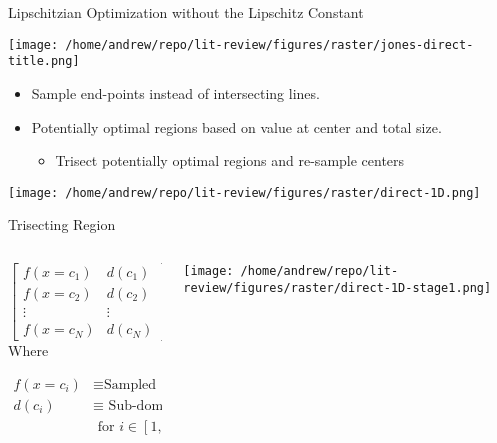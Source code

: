 \documentclass[presentation, aspectratio=1610]{beamer}
\begin{document}
\begin{frame}[label={sec:orgaa12c6b}]{Lipschitzian Optimization without the Lipschitz Constant}
\begin{center}
\texttt{[image: /home/andrew/repo/lit-review/figures/raster/jones-direct-title.png]}
\end{center}
\begin{itemize}
\item Sample end-points instead of intersecting lines.
\item Potentially optimal regions based on value at center and total size.
\begin{itemize}
\item Trisect potentially optimal regions and re-sample centers
\end{itemize}
\end{itemize}
\begin{center}
\texttt{[image: /home/andrew/repo/lit-review/figures/raster/direct-1D.png]}
\end{center}
\end{frame}
\begin{frame}[label={sec:org2f0a68a}]{Trisecting Region}
\begin{columns}
\begin{column}{0.4\columnwidth}
\begin{equation*}
  \begin{bmatrix}
    f(x=c_{1}) & d(c_{1})\\
    f(x=c_{2}) & d(c_{2})\\
    \vdots & \vdots \\
    f(x=c_{N}) & d(c_{N})
  \end{bmatrix}
\end{equation*}
Where

\begin{align*}
  f(x=c_{i}) &\equiv \text{Sampled function value} \\
  d(c_{i}) & \equiv \text{ Sub-domain size } \\
  & \text{ for } i \in [1,N]
\end{align*}
\end{column}

\begin{column}{0.6\columnwidth}
\begin{center}
\texttt{[image: /home/andrew/repo/lit-review/figures/raster/direct-1D-stage1.png]}
\end{center}
\end{column}
\end{columns}
\end{frame}
\end{document}
